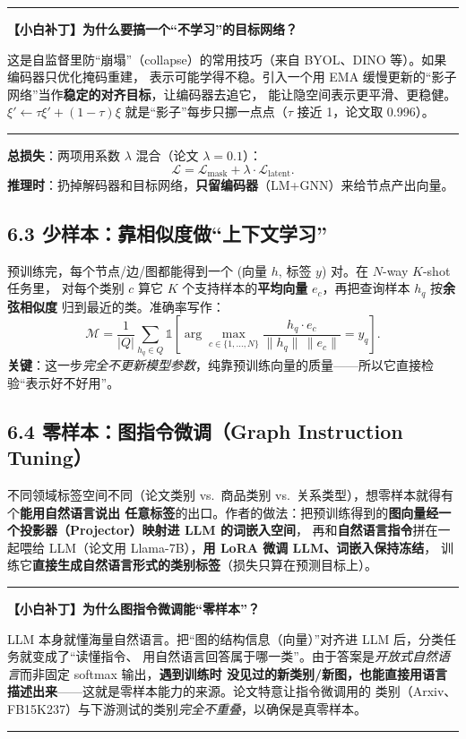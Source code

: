 \documentclass[11pt,UTF8,fontset=fandol]{ctexart}
\newenvironment{tip}[1]{%
  \par\smallskip\noindent\rule{\linewidth}{0.4pt}\par\nobreak
  \noindent\textbf{【小白补丁】#1}\par\nobreak\noindent\ignorespaces
}{%
  \par\noindent\rule{\linewidth}{0.4pt}\par\smallskip
}
\begin{document}
\begin{tip}{为什么要搞一个“不学习”的目标网络？}
这是自监督里防“崩塌”（collapse）的常用技巧（来自 BYOL、DINO 等）。如果编码器只优化掩码重建，
表示可能学得不稳。引入一个用 EMA 缓慢更新的“影子网络”当作\textbf{稳定的对齐目标}，让编码器去追它，
能让隐空间表示更平滑、更稳健。$\xi'\!\leftarrow\!\tau\xi'+(1-\tau)\xi$ 就是“影子”每步只挪一点点（$\tau$ 接近 1，论文取 0.996）。
\end{tip}

\textbf{总损失}：两项用系数 $\lambda$ 混合（论文 $\lambda=0.1$）：
\begin{equation*}
  \mathcal{L} = \mathcal{L}_{\text{mask}} + \lambda\cdot \mathcal{L}_{\text{latent}}. \tag{6}
\end{equation*}
\textbf{推理时}：扔掉解码器和目标网络，\textbf{只留编码器}（LM+GNN）来给节点产出向量。

\subsection{6.3 少样本：靠相似度做“上下文学习”}

预训练完，每个节点/边/图都能得到一个 (向量 $h$, 标签 $y$) 对。在 $N$-way $K$-shot 任务里，
对每个类别 $c$ 算它 $K$ 个支持样本的\textbf{平均向量} $e_c$，再把查询样本 $h_q$ 按\textbf{余弦相似度}
归到最近的类。准确率写作：
\begin{equation*}
  \mathcal{M} = \frac{1}{|Q|}\sum_{h_q\in Q}
    \mathbb{1}\!\left[\arg\max_{c\in\{1,\dots,N\}}\frac{h_q\cdot e_c}{\lVert h_q\rVert\,\lVert e_c\rVert} = y_q\right]. \tag{7}
\end{equation*}
\textbf{关键}：这一步\emph{完全不更新模型参数}，纯靠预训练向量的质量——所以它直接检验“表示好不好用”。

\subsection{6.4 零样本：图指令微调（Graph Instruction Tuning）}

不同领域标签空间不同（论文类别 vs.\ 商品类别 vs.\ 关系类型），想零样本就得有个\textbf{能用自然语言说出
任意标签}的出口。作者的做法：把预训练得到的\textbf{图向量经一个投影器（Projector）映射进 LLM 的词嵌入空间}，
再和\textbf{自然语言指令}拼在一起喂给 LLM（论文用 Llama-7B），\textbf{用 LoRA 微调 LLM、词嵌入保持冻结}，
训练它\textbf{直接生成自然语言形式的类别标签}（损失只算在预测目标上）。

\begin{tip}{为什么图指令微调能“零样本”？}
LLM 本身就懂海量自然语言。把“图的结构信息（向量）”对齐进 LLM 后，分类任务就变成了“读懂指令、
用自然语言回答属于哪一类”。由于答案是\emph{开放式自然语言}而非固定 softmax 输出，\textbf{遇到训练时
没见过的新类别/新图，也能直接用语言描述出来}——这就是零样本能力的来源。论文特意让指令微调用的
类别（Arxiv、FB15K237）与下游测试的类别\emph{完全不重叠}，以确保是真零样本。
\end{tip}
\end{document}
